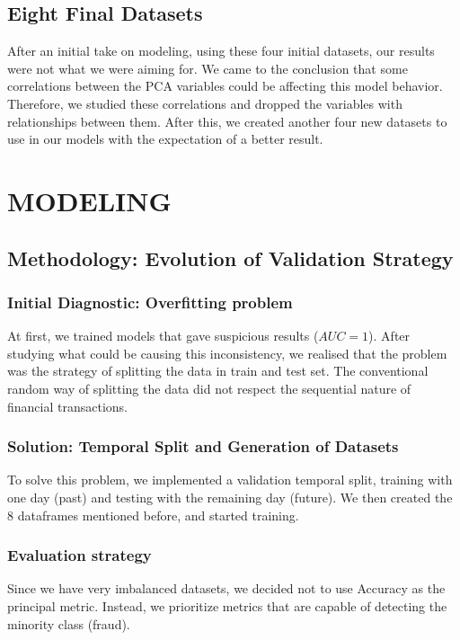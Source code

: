 \documentclass[12pt,a4paper]{report}
\begin{document}
\section{Eight Final Datasets}
After an initial take on modeling, using these four initial datasets, our results were not what we were aiming for. We came to the conclusion that some correlations between the PCA variables could be affecting this model behavior. Therefore, we studied these correlations and dropped the variables with relationships between them. After this, we created another four new datasets to use in our models with the expectation of a better result.

\chapter{MODELING}

\section{Methodology: Evolution of Validation Strategy}

\subsection{Initial Diagnostic: Overfitting problem}
At first, we trained models that gave suspicious results ($AUC = 1$). After studying what could be causing this inconsistency, we realised that the problem was the strategy of splitting the data in train and test set. The conventional random way of splitting the data did not respect the sequential nature of financial transactions.

\subsection{Solution: Temporal Split and Generation of Datasets}
To solve this problem, we implemented a validation temporal split, training with one day (past) and testing with the remaining day (future). We then created the 8 dataframes mentioned before, and started training.

\subsection{Evaluation strategy}
Since we have very imbalanced datasets, we decided not to use Accuracy as the principal metric. Instead, we prioritize metrics that are capable of detecting the minority class (fraud).
\end{document}
